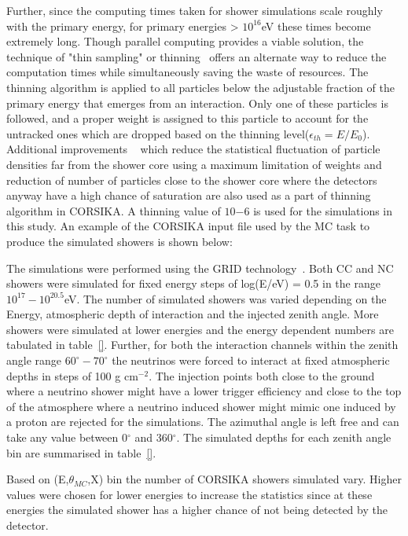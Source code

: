 Further, since the computing times taken for shower simulations scale roughly with the primary energy, for primary energies > $10^{16}$eV these times become extremely long. Though parallel computing provides a viable solution, the technique of "thin sampling" or thinning~\cite{} offers an alternate way to reduce the computation times while simultaneously saving the waste of resources. The thinning algorithm is applied to all particles below the adjustable fraction of the primary energy that emerges from an interaction. Only one of these particles is followed, and a proper weight is assigned to this particle to account for the untracked ones which are dropped based on the thinning level($\epsilon_{th} = E/E_0$). Additional improvements ~\cite{} which reduce the statistical fluctuation of particle densities far from the shower core using a maximum limitation of weights and reduction of number of particles close to the shower core where the detectors anyway have a high chance of saturation are also used as a part of thinning algorithm in CORSIKA. A thinning value of $10{-6}$ is used for the simulations in this study. An example of the CORSIKA input file used by the MC task to produce the simulated showers is shown below:


The simulations were performed using the GRID technology~\cite{}. Both CC and NC showers were simulated for fixed energy steps of log(E/eV) = 0.5 in the range $10^{17}-10^{20.5}$eV. The number of simulated showers was varied depending on the Energy, atmospheric depth of interaction and the injected zenith angle. More showers were simulated at lower energies and the energy dependent numbers are tabulated in table~\ref{}. Further, for both the interaction channels within the zenith angle range $60^{\circ}-70^{\circ}$ the neutrinos were forced to interact at fixed atmospheric depths in steps of 100 g cm$^{-2}$. The injection points both close to the ground where a neutrino shower might have a lower trigger efficiency and close to the top of the atmosphere where a neutrino induced shower might mimic one induced by a proton are rejected for the simulations. The azimuthal angle is left free and can take any value between 0$^{\circ}$ and 360$^{\circ}$. The simulated depths for each zenith angle bin are summarised in table~\ref{}. 

Based on (E,$\theta_{MC}$,X) bin the number of CORSIKA showers simulated vary. Higher values were chosen for lower energies to increase the statistics since at these energies the simulated shower has a higher chance of not being detected by the detector.  

